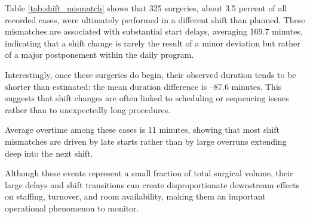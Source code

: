 \documentclass[
]{article}
\begin{document}
Table \ref{tab:shift_mismatch} shows that 325 surgeries, about 3.5
percent of all recorded cases, were ultimately performed in a different
shift than planned. These mismatches are associated with substantial
start delays, averaging 169.7 minutes, indicating that a shift change is
rarely the result of a minor deviation but rather of a major
postponement within the daily program.

Interestingly, once these surgeries do begin, their observed duration
tends to be shorter than estimated: the mean duration difference is
--87.6 minutes. This suggests that shift changes are often linked to
scheduling or sequencing issues rather than to unexpectedly long
procedures.

Average overtime among these cases is 11 minutes, showing that most
shift mismatches are driven by late starts rather than by large overruns
extending deep into the next shift.

Although these events represent a small fraction of total surgical
volume, their large delays and shift transitions can create
disproportionate downstream effects on staffing, turnover, and room
availability, making them an important operational phenomenon to
monitor.
\end{document}
